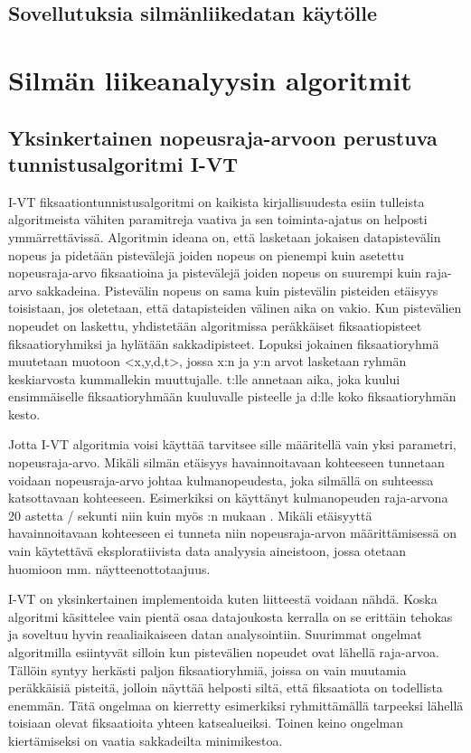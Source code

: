 \subsection{Sovellutuksia silmänliikedatan käytölle}


\section{Silmän liikeanalyysin algoritmit}
\subsection{Yksinkertainen nopeusraja-arvoon perustuva tunnistusalgoritmi I-VT}
I-VT fiksaationtunnistusalgoritmi on kaikista kirjallisuudesta esiin tulleista algoritmeista vähiten paramitreja vaativa ja sen toiminta-ajatus on helposti ymmärrettävissä. Algoritmin ideana on, että lasketaan jokaisen datapistevälin nopeus ja pidetään pistevälejä joiden nopeus on pienempi kuin asetettu nopeusraja-arvo fiksaatioina ja pistevälejä joiden nopeus on suurempi kuin raja-arvo sakkadeina. Pistevälin nopeus on sama kuin pistevälin pisteiden etäisyys toisistaan, jos oletetaan, että datapisteiden välinen aika on vakio. Kun pistevälien nopeudet on laskettu, yhdistetään algoritmissa peräkkäiset fiksaatiopisteet fiksaatioryhmiksi ja hylätään sakkadipisteet. Lopuksi jokainen fiksaatioryhmä muutetaan muotoon <x,y,d,t>, jossa x:n ja y:n arvot lasketaan ryhmän keskiarvosta kummallekin muuttujalle. t:lle annetaan aika, joka kuului ensimmäiselle fiksaatioryhmään kuuluvalle pisteelle ja d:lle koko fiksaatioryhmän kesto. \citep[s. 73]{salvucci2000}

 Jotta I-VT algoritmia voisi käyttää tarvitsee sille määritellä vain yksi parametri, nopeusraja-arvo. Mikäli silmän etäisyys havainnoitavaan kohteeseen tunnetaan voidaan nopeusraja-arvo johtaa kulmanopeudesta, joka silmällä on suhteessa katsottavaan kohteeseen. Esimerkiksi \citet[s. 1099]{itti2005} on käyttänyt kulmanopeuden raja-arvona 20 astetta / sekunti niin kuin myös \citet[s. 73]{salvucci2000}:n mukaan \citep[s. 103-111]{megaw1984}.
Mikäli etäisyyttä havainnoitavaan kohteeseen ei tunneta niin nopeusraja-arvon määrittämisessä on vain käytettävä eksploratiivista data analyysia aineistoon, jossa otetaan huomioon mm. näytteenottotaajuus.

I-VT on yksinkertainen implementoida kuten liitteestä \emph{}  voidaan nähdä. Koska algoritmi käsittelee vain pientä osaa datajoukosta kerralla on se erittäin tehokas ja soveltuu hyvin reaaliaikaiseen datan analysointiin. \citep[s. 76]{salvucci2000} Suurimmat ongelmat algoritmilla esiintyvät silloin kun pistevälien nopeudet ovat lähellä raja-arvoa. Tällöin syntyy herkästi paljon fiksaatioryhmiä, joissa on vain muutamia peräkkäisiä pisteitä, jolloin näyttää helposti siltä, että fiksaatiota on todellista enemmän. Tätä ongelmaa on kierretty esimerkiksi ryhmittämällä tarpeeksi lähellä toisiaan olevat fiksaatioita yhteen katsealueiksi. \citep[s. 329]{just1980} Toinen keino ongelman kiertämiseksi on vaatia sakkadeilta minimikestoa. \citep[s. 103-111]{megaw1984}

